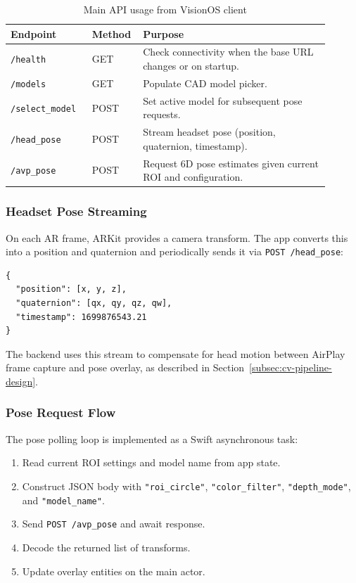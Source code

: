 \begin{table}[H]
    \centering
    \caption{Main API usage from VisionOS client}
    \label{tab:api-use-client}
    \begin{tabular}{p{0.24\linewidth}p{0.11\linewidth}p{0.55\linewidth}}
        \toprule
        \textbf{Endpoint} & \textbf{Method} & \textbf{Purpose} \\
        \midrule
        \texttt{/health} & GET &
        Check connectivity when the base URL changes or on startup. \\
        \texttt{/models} & GET &
        Populate CAD model picker. \\
        \texttt{/select\_model} & POST &
        Set active model for subsequent pose requests. \\
        \texttt{/head\_pose} & POST &
        Stream headset pose (position, quaternion, timestamp). \\
        \texttt{/avp\_pose} & POST &
        Request 6D pose estimates given current ROI and configuration. \\
        \bottomrule
    \end{tabular}
\end{table}

\subsubsection{Headset Pose Streaming}

On each AR frame, ARKit provides a camera transform. The app converts this into a position and quaternion and periodically sends it via \texttt{POST /head\_pose}:

\begin{verbatim}
{
  "position": [x, y, z],
  "quaternion": [qx, qy, qz, qw],
  "timestamp": 1699876543.21
}
\end{verbatim}

The backend uses this stream to compensate for head motion between AirPlay frame capture and pose overlay, as described in Section~\ref{subsec:cv-pipeline-design}.

\subsubsection{Pose Request Flow}

The pose polling loop is implemented as a Swift asynchronous task:

\begin{enumerate}
    \item Read current ROI settings and model name from app state.
    \item Construct JSON body with \texttt{"roi\_circle"}, \texttt{"color\_filter"}, \texttt{"depth\_mode"}, and \texttt{"model\_name"}.
    \item Send \texttt{POST /avp\_pose} and await response.
    \item Decode the returned list of transforms.
    \item Update overlay entities on the main actor.
\end{enumerate}

